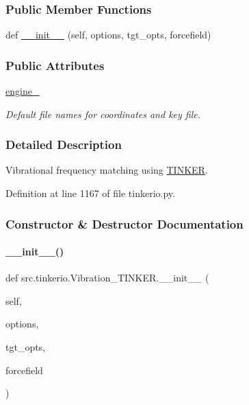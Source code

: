 \subsubsection*{Public Member Functions}
\begin{DoxyCompactItemize}
\item 
def \hyperlink{classsrc_1_1tinkerio_1_1Vibration__TINKER_a1852709be36661af5f38a5ec61a48cab}{\+\_\+\+\_\+init\+\_\+\+\_\+} (self, options, tgt\+\_\+opts, forcefield)
\end{DoxyCompactItemize}
\subsubsection*{Public Attributes}
\begin{DoxyCompactItemize}
\item 
\hyperlink{classsrc_1_1tinkerio_1_1Vibration__TINKER_a681786cadab4e8556d84e1e821e4e83f}{engine\+\_\+}
\begin{DoxyCompactList}\small\item\em Default file names for coordinates and key file. \end{DoxyCompactList}\end{DoxyCompactItemize}


\subsubsection{Detailed Description}
Vibrational frequency matching using \hyperlink{classsrc_1_1tinkerio_1_1TINKER}{T\+I\+N\+K\+ER}. 



Definition at line 1167 of file tinkerio.\+py.



\subsubsection{Constructor \& Destructor Documentation}
\mbox{\label{classsrc_1_1tinkerio_1_1Vibration__TINKER_a1852709be36661af5f38a5ec61a48cab}} 
\paragraph{\texorpdfstring{\+\_\+\+\_\+init\+\_\+\+\_\+()}{\_\_init\_\_()}}
{\footnotesize\ttfamily def src.\+tinkerio.\+Vibration\+\_\+\+T\+I\+N\+K\+E\+R.\+\_\+\+\_\+init\+\_\+\+\_\+ (\begin{DoxyParamCaption}\item[{}]{self,  }\item[{}]{options,  }\item[{}]{tgt\+\_\+opts,  }\item[{}]{forcefield }\end{DoxyParamCaption})}



